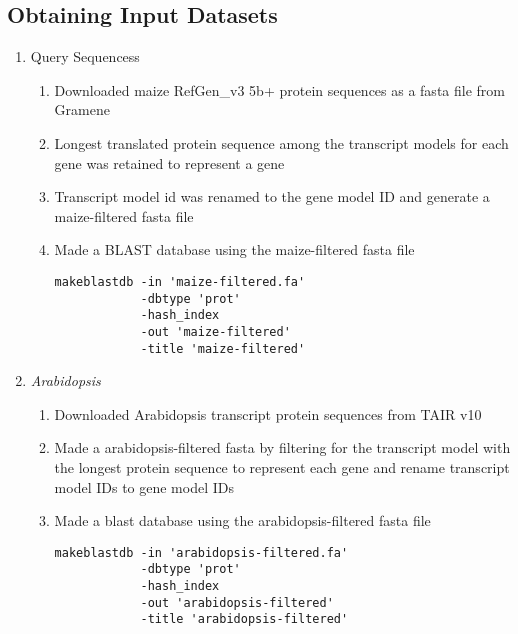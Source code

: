 \documentclass[11pt,letterpaper]{article}
\begin{document}
  \subsection{Obtaining Input Datasets}
  \begin{enumerate}
    \item Query Sequencess
    \begin{enumerate}
      \item Downloaded maize RefGen\_v3 5b+ protein sequences as a fasta file from Gramene
      \item Longest translated protein sequence among the transcript models for each gene was retained to represent a gene
      \item Transcript model id was renamed to the gene model ID and generate a maize-filtered fasta file
      \item Made a BLAST database using the maize-filtered fasta file
            \begin{verbatim}
makeblastdb -in 'maize-filtered.fa'
            -dbtype 'prot'
            -hash_index
            -out 'maize-filtered'
            -title 'maize-filtered'
            \end{verbatim}
    \end{enumerate}
    \item \emph{Arabidopsis}
    \begin{enumerate}
      \item Downloaded Arabidopsis transcript protein sequences from TAIR v10
      \item Made a arabidopsis-filtered fasta by filtering for the transcript model with the longest protein sequence to represent each gene and rename transcript model IDs to gene model IDs
      \item Made a blast database using the arabidopsis-filtered fasta file \\
            \begin{verbatim}
makeblastdb -in 'arabidopsis-filtered.fa'
            -dbtype 'prot'
            -hash_index
            -out 'arabidopsis-filtered'
            -title 'arabidopsis-filtered'
            \end{verbatim}


\end{enumerate}
\end{enumerate}
\end{document}
